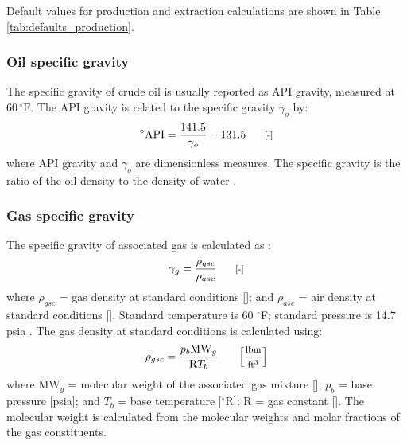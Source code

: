 \documentclass[11pt]{report}
\newcommand{\marg}[1]{{\footnotesize\textit{\textcolor{stanford}{'#1'}}}}
\newcommand{\marginnote}[1]{\marginpar{\marg{#1}}}
\begin{document}

Default values for production and extraction calculations are shown in Table \ref{tab:defaults_production}. 


\subsubsection{Oil specific gravity}

The specific gravity of crude oil is usually reported as API gravity, measured at $60\,^{\circ}\mathrm{F}$. The API gravity is related to the specific gravity $\gamma_o$ by: \marginnote{Production \& Extraction 2.1.1} 
\begin{equation}\label{eq:production_API_gravity}
^{\circ}\text{API}=\frac{141.5}{\gamma _{o}}-131.5 \begin{footnotesize}\quad\quad\text{[-]}\end{footnotesize} 
\end{equation}
where API gravity and $\gamma_o$ are dimensionless measures. The specific gravity is the ratio of the oil density to the density of water \cite[p. 478]{Mcallister2009}.

\subsubsection{Gas specific gravity}

The specific gravity of associated gas is calculated as \cite[p. 10]{Takacs2005}: \marginnote{Production \& Extraction 2.1.4} 
\begin{equation} \label{eq:gas_gravity}
\gamma _{g}=\frac{\rho _{gsc}}{\rho _{asc}} \begin{footnotesize} \quad\quad\text{[-]} \end{footnotesize}
\end{equation}
where $\rho _{gsc}$ = gas density at standard conditions []; and $\rho _{asc}$ = air density at standard conditions []. Standard temperature is 60 $^{\circ}${F}; standard pressure is 14.7 psia \cite[p. 35]{Manning1991}. The gas density at standard conditions is calculated using:
\begin{equation} \label{eq:gas_density}
\rho _{gsc}=\frac{p_{b} \text{MW$_{g}$}}{\text{R} T_{b}} \begin{footnotesize} \quad\quad \left[\frac{\text{lbm}}{\text{ft$^3$}}\right] \end{footnotesize}
\end{equation}
where MW$_{g}$ = molecular weight of the associated gas mixture []; $p_{b}$ = base pressure [psia]; and $T_{b}$ = base temperature [$^{\circ}$R]; R = gas constant []. The molecular weight is calculated from the molecular weights and molar fractions of the gas constituents.
\end{document}

